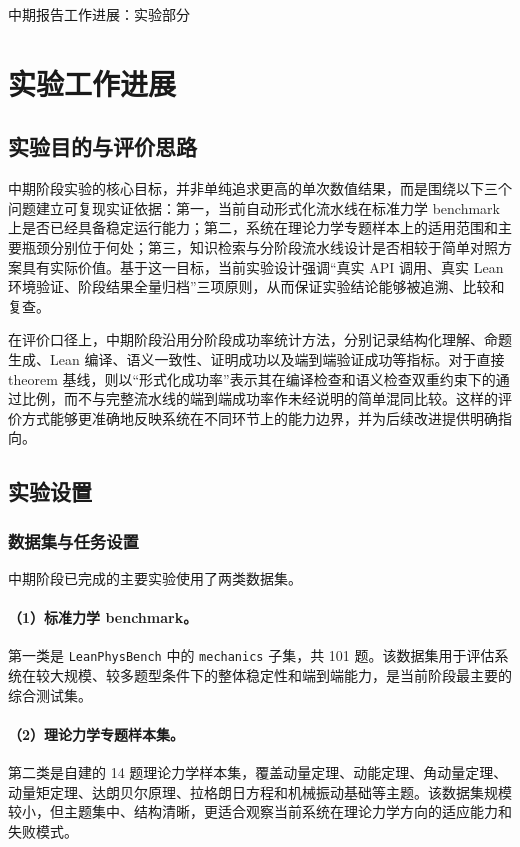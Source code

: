 \documentclass[12pt,a4paper]{ctexart}
\begin{document}
\begin{center}
    {\heiti 中期报告工作进展：实验部分}
\end{center}

\section{实验工作进展}

\subsection{实验目的与评价思路}

中期阶段实验的核心目标，并非单纯追求更高的单次数值结果，而是围绕以下三个问题建立可复现实证依据：第一，当前自动形式化流水线在标准力学 benchmark 上是否已经具备稳定运行能力；第二，系统在理论力学专题样本上的适用范围和主要瓶颈分别位于何处；第三，知识检索与分阶段流水线设计是否相较于简单对照方案具有实际价值。基于这一目标，当前实验设计强调“真实 API 调用、真实 Lean 环境验证、阶段结果全量归档”三项原则，从而保证实验结论能够被追溯、比较和复查。

在评价口径上，中期阶段沿用分阶段成功率统计方法，分别记录结构化理解、命题生成、Lean 编译、语义一致性、证明成功以及端到端验证成功等指标。对于直接 theorem 基线，则以“形式化成功率”表示其在编译检查和语义检查双重约束下的通过比例，而不与完整流水线的端到端成功率作未经说明的简单混同比较。这样的评价方式能够更准确地反映系统在不同环节上的能力边界，并为后续改进提供明确指向。

\subsection{实验设置}

\subsubsection{数据集与任务设置}

中期阶段已完成的主要实验使用了两类数据集。

\paragraph{（1）标准力学 benchmark。}
第一类是 \texttt{LeanPhysBench} 中的 \texttt{mechanics} 子集，共 101 题。该数据集用于评估系统在较大规模、较多题型条件下的整体稳定性和端到端能力，是当前阶段最主要的综合测试集。

\paragraph{（2）理论力学专题样本集。}
第二类是自建的 14 题理论力学样本集，覆盖动量定理、动能定理、角动量定理、动量矩定理、达朗贝尔原理、拉格朗日方程和机械振动基础等主题。该数据集规模较小，但主题集中、结构清晰，更适合观察当前系统在理论力学方向的适应能力和失败模式。
\end{document}
